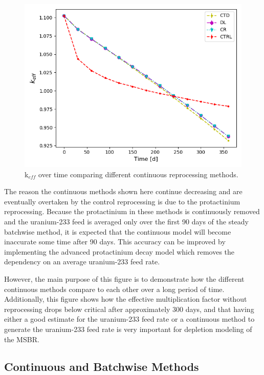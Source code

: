 \begin{figure}[H]
  \centering
  \includegraphics[scale=0.7]{images/cont-compare-keff-1.png}
  \caption{k$_{eff}$ over time comparing different continuous reprocessing methods.}
   \label{fig:continuous-compare}
\end{figure}

The reason the continuous methods shown here continue decreasing and are eventually overtaken by the control reprocessing is due to the protactinium reprocessing. Because the protactinium in these methods is continuously removed and the uranium-233 feed is averaged only over the first 90 days of the steady batchwise method, it is expected that the continuous model will become inaccurate some time after 90 days. This accuracy can be improved by implementing the advanced protactinium decay model which removes the dependency on an average uranium-233 feed rate.

However, the main purpose of this figure is to demonstrate how the different continuous methods compare to each other over a long period of time. Additionally, this figure shows how the effective multiplication factor without reprocessing drops below critical after approximately 300 days, and that having either a good estimate for the uranium-233 feed rate or a continuous method to generate the uranium-233 feed rate is very important for depletion modeling of the MSBR.


\subsection{Continuous and Batchwise Methods}

